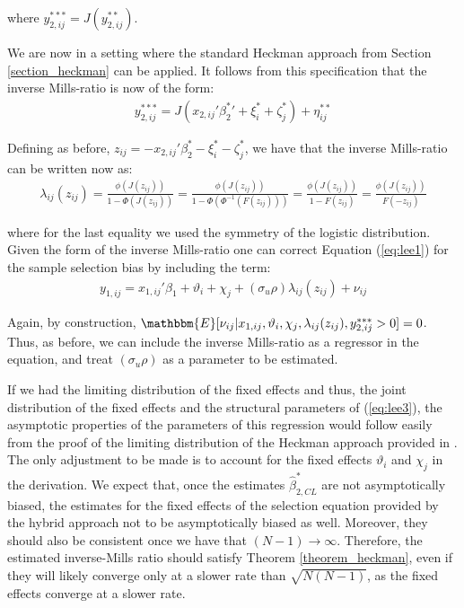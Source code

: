 \noindent where $y_{2,i j}^{***}=J(y_{2,i j}^{**})$. 

We are now in a setting where the standard Heckman approach from Section \ref{section_heckman} can be applied. It follows from this specification that the inverse Mills-ratio is now of the form:
\begin{align}
  y_{2,i j}^{***}= J(x_{2,ij}'{\beta_2^*}'  +\xi_{i}^*+\zeta_{j}^* )+\eta^{**}_{i j}
  \label{eq:lee3}
\end{align}

Defining as before, $z_{ij} = -x_{2,ij}'\beta_2^* - \xi_{i}^* - \zeta_{j}^*$, we have that the inverse Mills-ratio can be written now as:
\begin{align*}
  \lambda_{ij} (z_{ij}) = \frac{\phi(J(z_{ij}))}{1 - \Phi(J(z_{ij}))} = \frac{\phi(J(z_{ij}))}{1 - \Phi(\Phi^{-1}(F(z_{ij})))} = \frac{\phi(J(z_{ij}))}{1 - F(z_{ij})} = \frac{\phi(J(z_{ij}))}{F(-z_{ij})}
\end{align*}

\noindent where for the last equality we used the symmetry of the logistic distribution. Given the form of the inverse Mills-ratio one can correct Equation (\ref{eq:lee1}) for the sample selection bias by including the term:
\begin{align}
  y_{1,ij} = x_{1,ij}'\beta_1 + \vartheta_i + \chi_j + (\sigma_u\rho) \lambda_{ij} (z_{ij}) + \nu_{ij}
  \label{eq:lee2}
  \end{align}

Again, by construction, $\mathbbm{E}[\nu_{ij} \rvert x_{1,ij}, \vartheta_i, \chi_j, \lambda_{ij} (z_{ij}), y_{2,i j}^{***} > 0] = 0$. Thus, as before, we can include the inverse Mills-ratio as a regressor in the equation, and treat $(\sigma_u\rho)$ as a parameter to be estimated. 

If we had the limiting distribution of the fixed effects and thus, the joint distribution of the fixed effects and the structural parameters of (\ref{eq:lee3}), the asymptotic properties of the parameters of this regression would follow easily from the proof of the limiting distribution of the Heckman approach provided in \cite{heckman1979sample}. The only adjustment to be made is to account for the fixed effects $\vartheta_i$ and $\chi_j$ in the derivation. We expect that, once the estimates $\hat{\beta}_{2,CL}^*$ are not asymptotically biased, the estimates for the fixed effects of the selection equation provided by the hybrid approach not to be asymptotically biased as well. Moreover, they should also be consistent once we have that $(N-1) \xrightarrow{} \infty$. Therefore, the estimated inverse-Mills ratio should satisfy Theorem \ref{theorem_heckman}, even if they will likely converge only at a slower rate than $\sqrt{N(N-1)}$, as the fixed effects converge at a slower rate.



